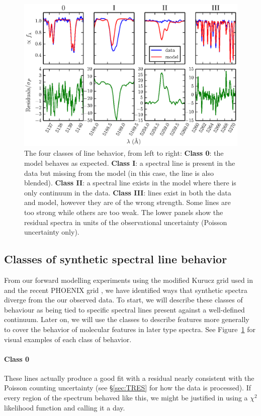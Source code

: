 \documentclass[preprint]{aastex} %
\begin{document}
\begin{figure}[!htb]
\begin{center}
\includegraphics{lineclasses}
\caption{The four classes of line behavior, from left to right: \textbf{Class 0}: the model behaves as expected. \textbf{Class I}: a spectral line is present in the data but missing from the model (in this case, the line is also blended). \textbf{Class II}: a spectral line exists in the model where there is only continuum in the data. \textbf{Class III}: lines exist in both the data and model, however they are of the wrong strength. Some lines are too strong while others are too weak. The lower panels show the residual spectra in units of the observational uncertainty (Poisson uncertainty only).}
\label{fig:lineclasses}
\end{center}
\end{figure}

\subsection{Classes of synthetic spectral line behavior}
From our forward modelling experiments using the modified Kurucz grid used in \citet{blj+12} and the recent PHOENIX grid \citep{hwd+13}, we have identified ways that synthetic spectra diverge from the our observed data. To start, we will describe these classes of behaviour as being tied to specific spectral lines present against a well-defined continuum. Later on, we will use the classes to describe features more generally to cover the behavior of molecular features in later type spectra. See Figure~\ref{fig:lineclasses} for visual examples of each class of behavior.

\paragraph{Class 0} These lines actually produce a good fit with a residual nearly consistent with the Poisson counting uncertainty (see \S\ref{sec:TRES} for how the data is processed). If every region of the spectrum behaved like this, we might be justified in using a $\chi^2$ likelihood function and calling it a day.
\end{document}
